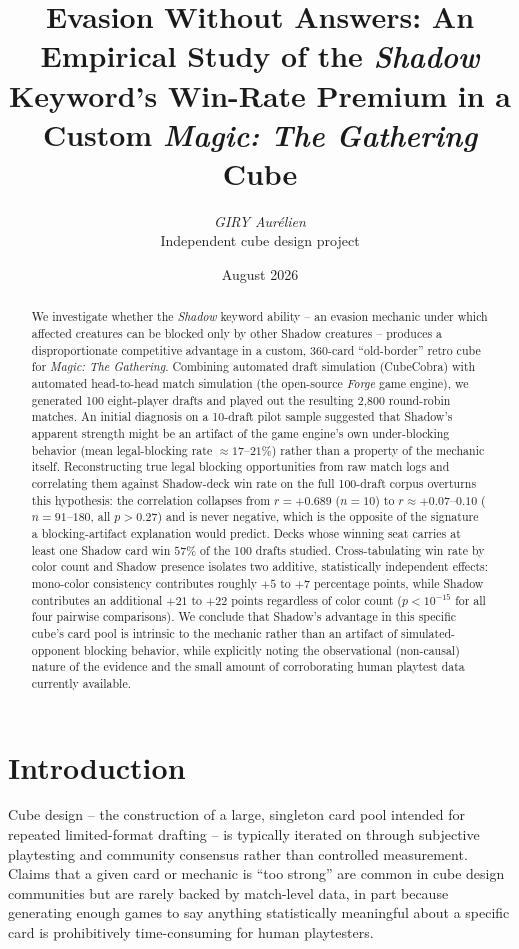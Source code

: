 \documentclass[11pt]{article}
\title{Evasion Without Answers: An Empirical Study of the \emph{Shadow} \\
Keyword's Win-Rate Premium in a Custom \emph{Magic: The Gathering} Cube}
\author{
  \textit{GIRY Aurélien} \\
  \small Independent cube design project
}
\date{August 2026}
\begin{document}
\maketitle

\begin{abstract}
We investigate whether the \emph{Shadow} keyword ability -- an evasion mechanic under
which affected creatures can be blocked only by other Shadow creatures -- produces a
disproportionate competitive advantage in a custom, 360-card ``old-border'' retro cube
for \emph{Magic: The Gathering}. Combining automated draft simulation
(CubeCobra) with automated head-to-head match simulation (the open-source \emph{Forge}
game engine), we generated 100 eight-player drafts and played out the resulting
2{,}800 round-robin matches. An initial diagnosis on a 10-draft pilot sample suggested
that Shadow's apparent strength might be an artifact of the game engine's own
under-blocking behavior (mean legal-blocking rate $\approx 17$--$21\%$) rather than a
property of the mechanic itself. Reconstructing true legal blocking opportunities from
raw match logs and correlating them against Shadow-deck win rate on the full
100-draft corpus overturns this hypothesis: the correlation collapses from
$r=+0.689$ ($n=10$) to $r \approx +0.07$--$0.10$ ($n=91$--$180$, all
$p>0.27$) and is never negative, which is the opposite of the signature a
blocking-artifact explanation would predict. Decks whose winning seat carries at
least one Shadow card win $57\%$ of the 100 drafts studied. Cross-tabulating win
rate by color count and Shadow presence isolates two additive, statistically
independent effects: mono-color consistency contributes roughly $+5$ to $+7$
percentage points, while Shadow contributes an additional $+21$ to $+22$ points
regardless of color count ($p<10^{-15}$ for all four pairwise comparisons). We
conclude that Shadow's advantage in this specific cube's card pool is intrinsic
to the mechanic rather than an artifact of simulated-opponent blocking behavior,
while explicitly noting the observational (non-causal) nature of the evidence and
the small amount of corroborating human playtest data currently available.
\end{abstract}

\section{Introduction}

Cube design -- the construction of a large, singleton card pool intended for repeated
limited-format drafting -- is typically iterated on through subjective playtesting and
community consensus rather than controlled measurement. Claims that a given card or
mechanic is ``too strong'' are common in cube design communities but are rarely
backed by match-level data, in part because generating enough games to say anything
statistically meaningful about a specific card is prohibitively time-consuming for
human playtesters.
\end{document}
